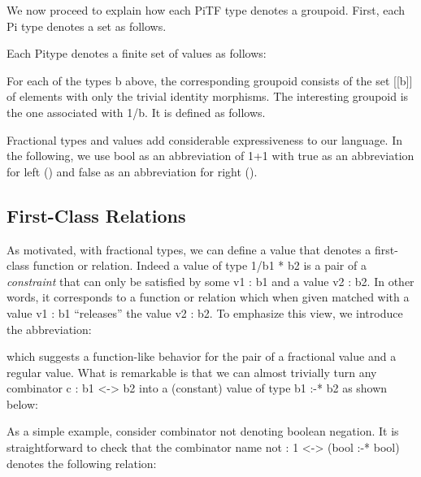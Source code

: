 \documentclass{llncs}
\begin{document}
We now proceed to explain how each {{PiTF}} type denotes a groupoid. First,
each {{Pi}} type denotes a set as follows.

\begin{definition}
\label{chx:def:denot}
Each {{Pi}}type denotes a finite set of values as follows:
\end{definition}

For each of the types {{b}} above, the corresponding groupoid consists of the
set {{ [[b]] }} of elements with only the trivial identity morphisms. The
interesting groupoid is the one associated with {{1/b}}. It is defined as
follows. 

Fractional types and values add considerable expressiveness to our
language. In the following, we use {{bool}} as an abbreviation of {{1+1}} 
with {{true}} as an abbreviation for {{left ()}} and {{false}} as an 
abbreviation for {{right ()}}.

\subsection{First-Class Relations}

As motivated, with fractional types, we can define a value that denotes a
first-class function or relation. Indeed a value of type {{1/b1 * b2}} is a
pair of a \emph{constraint} that can only be satisfied by some {{v1 : b1}}
and a value {{v2 : b2}}. In other words, it corresponds to a function or
relation which when given matched with a value {{v1 : b1}} ``releases'' the
value {{v2 : b2}}. To emphasize this view, we introduce the abbreviation:


\noindent which suggests a function-like behavior for the pair of a fractional value
and a regular value. What is remarkable is that we can almost trivially turn
any combinator {{c : b1 <-> b2}} into a (constant) value of 
type {{b1 :-* b2}} as shown below:


As a simple example, consider combinator {{not}} denoting boolean negation.
It is straightforward to check that the combinator 
{{name not : 1 <-> (bool :-* bool)}} denotes the following
relation:
\end{document}
